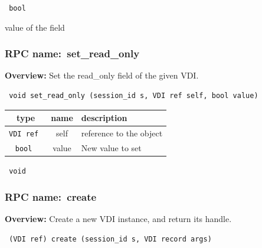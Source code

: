 \vspace{0.3cm}

{\tt 
bool
}


value of the field
\vspace{0.3cm}
\vspace{0.3cm}
\vspace{0.3cm}
\subsubsection{RPC name:~set\_read\_only}

{\bf Overview:} 
Set the read\_only field of the given VDI.

\begin{verbatim} void set_read_only (session_id s, VDI ref self, bool value)\end{verbatim}



 
\vspace{0.3cm}
\begin{tabular}{|c|c|p{7cm}|}
 \hline
{\bf type} & {\bf name} & {\bf description} \\ \hline
{\tt VDI ref } & self & reference to the object \\ \hline 

{\tt bool } & value & New value to set \\ \hline 

\end{tabular}

\vspace{0.3cm}

{\tt 
void
}



\vspace{0.3cm}
\vspace{0.3cm}
\vspace{0.3cm}
\subsubsection{RPC name:~create}

{\bf Overview:} 
Create a new VDI instance, and return its handle.

\begin{verbatim} (VDI ref) create (session_id s, VDI record args)\end{verbatim}



